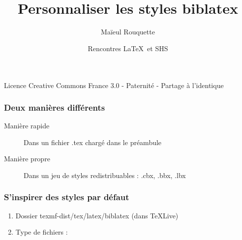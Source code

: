 \documentclass{beamer}
\author{Maïeul Rouquette}
\date{Rencontres \LaTeX\ et SHS}
\title{Personnaliser les styles biblatex}
\institute{Université de Lausanne --- IRSB}
\begin{document}
\begin{frame}
	\titlepage
	\vfill
	{\tiny Licence Creative Commons France 3.0 - Paternité - Partage à l'identique}
\end{frame}

\begin{frame}
	\frametitle{Deux manières différents}
	\begin{description}
		\item[\alert<1>{Manière rapide}] Dans un fichier .tex chargé dans le préambule
		\item[\alert<2>{Manière propre}] Dans un jeu de styles redistribuables : .cbx, .bbx, .lbx
	\end{description}
\end{frame}

\begin{frame}
	\frametitle{S'inspirer des styles par défaut}
	\begin{enumerate}
		\item<1->Dossier texmf-dist/tex/latex/biblatex (dans \TeX Live)
		\item<2->Type de fichiers :
	\end{enumerate}
\end{frame}
\end{document}
